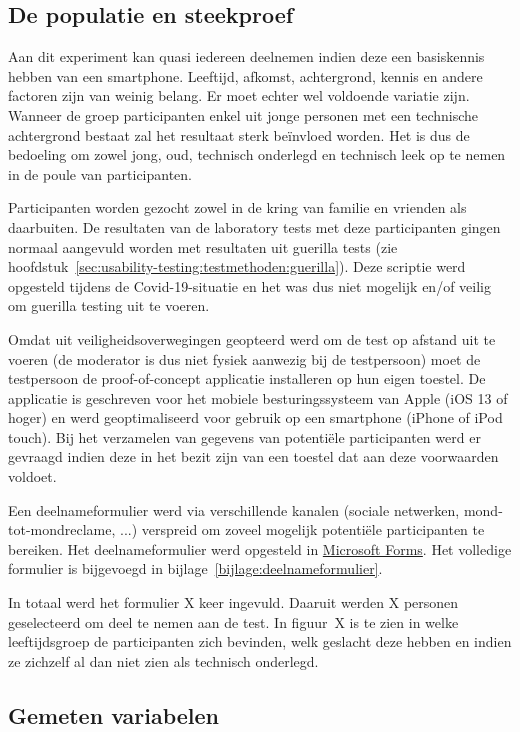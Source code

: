 \subsection{De populatie en steekproef}
\label{sec:experiment:populatie-steekproef}

Aan dit experiment kan quasi iedereen deelnemen indien deze een basiskennis hebben van een smartphone. Leeftijd, afkomst, achtergrond, kennis en andere factoren zijn van weinig belang. Er moet echter wel voldoende variatie zijn. Wanneer de groep participanten enkel uit jonge personen met een technische achtergrond bestaat zal het resultaat sterk beïnvloed worden. Het is dus de bedoeling om zowel jong, oud, technisch onderlegd en technisch leek op te nemen in de poule van participanten.

Participanten worden gezocht zowel in de kring van familie en vrienden als daarbuiten. De resultaten van de laboratory tests met deze participanten gingen normaal aangevuld worden met resultaten uit guerilla tests (zie hoofdstuk~\ref{sec:usability-testing:testmethoden:guerilla}). Deze scriptie werd opgesteld tijdens de Covid-19-situatie en het was dus niet mogelijk en/of veilig om guerilla testing uit te voeren.

Omdat uit veiligheidsoverwegingen geopteerd werd om de test op afstand uit te voeren (de moderator is dus niet fysiek aanwezig bij de testpersoon) moet de testpersoon de proof-of-concept applicatie installeren op hun eigen toestel. De applicatie is geschreven voor het mobiele besturingssysteem van Apple (iOS 13 of hoger) en werd geoptimaliseerd voor gebruik op een smartphone (iPhone of iPod touch). Bij het verzamelen van gegevens van potentiële participanten werd er gevraagd indien deze in het bezit zijn van een toestel dat aan deze voorwaarden voldoet.

Een deelnameformulier werd via verschillende kanalen (sociale netwerken, mond-tot-mondreclame, ...) verspreid om zoveel mogelijk potentiële participanten te bereiken. Het deelnameformulier werd opgesteld in \href{https://forms.office.com/}{Microsoft Forms}. Het volledige formulier is bijgevoegd in bijlage~\ref{bijlage:deelnameformulier}.

In totaal werd het formulier X keer ingevuld. Daaruit werden X personen geselecteerd om deel te nemen aan de test. In figuur~X is te zien in welke leeftijdsgroep de participanten zich bevinden, welk geslacht deze hebben en indien ze zichzelf al dan niet zien als technisch onderlegd.

\subsection{Gemeten variabelen}
\label{sec:experiment:variabelen}

